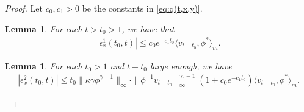 \documentclass[12pt,a4paper]{amsart}
\newtheorem{lem}[thm]{Lemma}
\theoremstyle{definition}
\numberwithin{equation}{section}
\begin{document}
\begin{proof}
Let $c_0, c_1>0$ be the constants in \eqref{eq:q(t,x,y)}.
\begin{lem}
  \label{lem:bound_for_epsilon1}
  For each $t > t_0 > 1$, we have that
  \begin{align}
    |\epsilon_x^1(t_0,t)|
    \leq c_0 e^{-c_1 t_0}\langle v_{t-t_0},\phi^* \rangle_m.
  \end{align}
\end{lem}

\begin{lem}
  \label{lem:upperbound_of_epsilon-2}
  For each $t_0 > 1$ and $t - t_0$ large enough, we have
  \begin{align}
    \label{eq:upperbound_of_epsilon-2}
    |\epsilon_x^2(t_0,t)|
    \leq t_0\|\kappa\gamma\phi^{\gamma - 1}\|_{\infty} \cdot \|\phi^{-1}v_{t-t_0}\|^{\gamma_0-1}_\infty (1+c_0 e^{-c_1 t_0}) \langle v_{t-t_0},\phi^* \rangle_m.
  \end{align}
\end{lem}




\end{proof}
\end{document}
